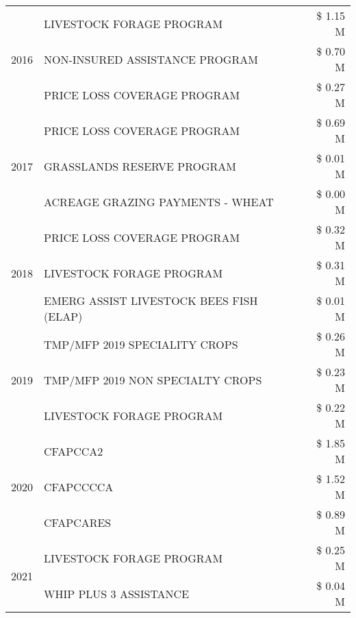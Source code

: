 \begin{tabular}{llr}
\multirow[t]{3}{*}{2016} & LIVESTOCK FORAGE PROGRAM & \$ 1.15 M \\
 & NON-INSURED ASSISTANCE PROGRAM & \$ 0.70 M \\
 & PRICE LOSS COVERAGE PROGRAM & \$ 0.27 M \\
\cline{1-3}
\multirow[t]{3}{*}{2017} & PRICE LOSS COVERAGE PROGRAM & \$ 0.69 M \\
 & GRASSLANDS RESERVE PROGRAM & \$ 0.01 M \\
 & ACREAGE GRAZING PAYMENTS - WHEAT & \$ 0.00 M \\
\cline{1-3}
\multirow[t]{3}{*}{2018} & PRICE LOSS COVERAGE PROGRAM & \$ 0.32 M \\
 & LIVESTOCK FORAGE PROGRAM & \$ 0.31 M \\
 & EMERG ASSIST LIVESTOCK BEES FISH (ELAP) & \$ 0.01 M \\
\cline{1-3}
\multirow[t]{3}{*}{2019} & TMP/MFP 2019 SPECIALITY CROPS & \$ 0.26 M \\
 & TMP/MFP 2019 NON SPECIALTY CROPS & \$ 0.23 M \\
 & LIVESTOCK FORAGE PROGRAM & \$ 0.22 M \\
\cline{1-3}
\multirow[t]{3}{*}{2020} & CFAPCCA2 & \$ 1.85 M \\
 & CFAPCCCCA & \$ 1.52 M \\
 & CFAPCARES & \$ 0.89 M \\
\cline{1-3}
\multirow[t]{2}{*}{2021} & LIVESTOCK FORAGE PROGRAM & \$ 0.25 M \\
 & WHIP PLUS 3 ASSISTANCE & \$ 0.04 M \\
\cline{1-3}
\bottomrule
\end{tabular}
